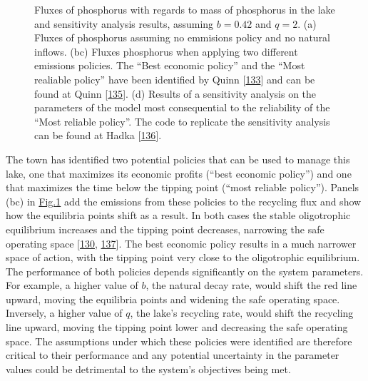 \documentclass[letterpaper,10pt,english]{sphinxmanual}
\let\sphinxpxdimen\pdfpxdimen\else\newdimen\sphinxpxdimen
\begin{document}
\begin{figure}[htbp]
\centering
\capstart

\noindent\sphinxincludegraphics[width=700\sphinxpxdimen]{{figure4_3_lake_problem_fluxes}.png}
\caption{Fluxes of phosphorus with regards to mass of phosphorus in the lake and sensitivity analysis results, assuming \(b=0.42\) and \(q=2\). (a) Fluxes of phosphorus assuming no emmisions policy and no natural inflows. (b\sphinxhyphen{}c) Fluxes phosphorus when applying two different emissions policies. The “Best economic policy” and the “Most realiable policy” have been identified by Quinn  {[}\hyperlink{cite.index:id61}{133}{]} and can be found at Quinn {[}\hyperlink{cite.index:id164}{135}{]}. (d) Results of a sensitivity analysis on the parameters of the model most consequential to the reliability of the “Most reliable policy”. The code to replicate the sensitivity analysis can be found at Hadka {[}\hyperlink{cite.index:id165}{136}{]}.}\label{\detokenize{4_sensitivity_analysis_diagnostic_and_exploratory_modeling:id51}}\label{\detokenize{4_sensitivity_analysis_diagnostic_and_exploratory_modeling:figure-4-3}}\end{figure}

\sphinxAtStartPar
The town has identified two potential policies that can be used to manage this lake, one that maximizes its economic profits (“best economic policy”) and one that maximizes the time below the tipping point (“most reliable policy”). Panels (b\sphinxhyphen{}c) in \hyperref[\detokenize{4_sensitivity_analysis_diagnostic_and_exploratory_modeling:figure-4-3}]{Fig.\@ \ref{\detokenize{4_sensitivity_analysis_diagnostic_and_exploratory_modeling:figure-4-3}}} add the emissions from these policies to the recycling flux and show how the equilibria points shift as a result. In both cases the stable oligotrophic equilibrium increases and the tipping point decreases, narrowing the safe operating space {[}\hyperlink{cite.index:id59}{130}, \hyperlink{cite.index:id166}{137}{]}. The best economic policy results in a much narrower space of action, with the tipping point very close to the oligotrophic equilibrium. The performance of both policies depends significantly on the system parameters. For example, a higher value of \(b\), the natural decay rate, would shift the red line upward, moving the equilibria points and widening the safe operating space. Inversely, a higher value of \(q\), the lake’s recycling rate, would shift the recycling line upward, moving the tipping point lower and decreasing the safe operating space. The assumptions under which these policies were identified are therefore critical to their performance and any potential uncertainty in the parameter values could be detrimental to the system’s objectives being met.
\end{document}
